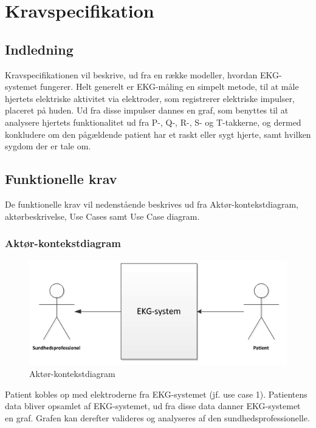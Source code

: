 \chapter{Kravspecifikation}

\section{Indledning}
Kravspecifikationen vil beskrive, ud fra en række modeller, hvordan EKG-systemet fungerer. Helt generelt er EKG-måling en simpelt metode, til at måle hjertets elektriske aktivitet via elektroder, som registrerer elektriske impulser, placeret på huden. Ud fra disse impulser dannes en graf, som benyttes til at analysere hjertets funktionalitet ud fra P-, Q-, R-, S- og T-takkerne, og dermed konkludere om den pågældende patient har et raskt eller sygt hjerte, samt hvilken sygdom der er tale om.

\section{Funktionelle krav}
De funktionelle krav vil nedenstående beskrives ud fra Aktør-kontekstdiagram, aktørbeskrivelse, Use Cases samt Use Case diagram. 

\subsection{Aktør-kontekstdiagram}

\begin{figure}[htb]
	\centering
	\includegraphics[width=1\textwidth]{Figurer/Snip20150226_1}
	\caption{Aktør-kontekstdiagram}
	\label{fig:aktoerbeskrivelse}
\end{figure}

Patient kobles op med elektroderne fra EKG-systemet (jf. use case 1). Patientens data bliver opsamlet af EKG-systemet, ud fra disse data danner EKG-systemet en graf. Grafen kan derefter valideres og analyseres af den sundhedsprofessionelle. 

